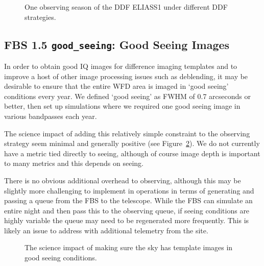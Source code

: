 \begin{figure}
\caption{One observing season of the DDF ELIASS1 under different DDF strategies. }\label{fig:ddfexamples}
\end{figure}




\subsection{FBS 1.5 {\tt good\_seeing}: Good Seeing Images}\label{ss:goodseeing}

In order to obtain good IQ images for difference imaging templates and to improve a host of other image processing issues such as deblending, it may be desirable to ensure that the entire WFD area is imaged in `good seeing' conditions every year. We defined `good seeing' as FWHM of 0.7 arcseconds or better, then set up simulations where we required one good seeing image in various bandpasses each year.

The science impact of adding this relatively simple constraint to the observing strategy seem minimal and generally positive (see Figure~\ref{fig:goodseeing_radar}). We do not currently have a metric tied directly to seeing, although of course image depth is important to many metrics and this depends on seeing. 

There is no obvious additional overhead to observing, although this may be slightly more challenging to implement in operations in terms of generating and passing a queue from the FBS to the telescope. While the FBS can simulate an entire night and then pass this to the observing queue, if seeing conditions are highly variable the queue may need to be regenerated more frequently. This is likely an issue to address with additional telemetry from the site.

\begin{figure}
\caption{The science impact of making sure the sky has template images in good seeing conditions.} \label{fig:goodseeing_radar}
\end{figure}



